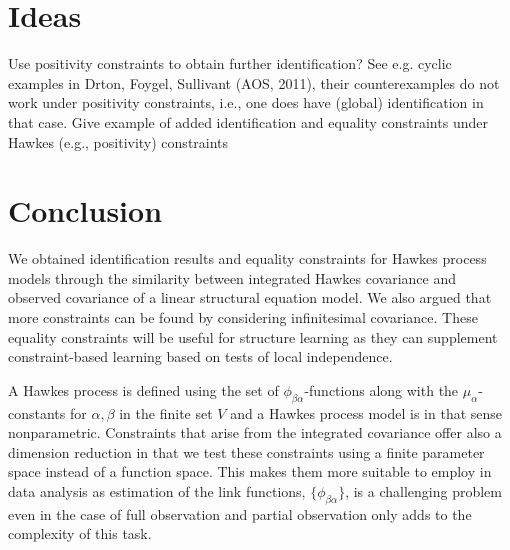 \documentclass[accepted]{uai2021} %
\begin{document}

\section{Ideas}

Use positivity constraints to obtain further identification? See e.g. cyclic 
examples in Drton, Foygel, Sullivant (AOS, 2011), their counterexamples do not 
work under positivity constraints, i.e., one does have (global) identification 
in that case. Give example of added identification and equality constraints 
under Hawkes (e.g., positivity) constraints

\section{Conclusion}

We obtained identification results and equality constraints for Hawkes process 
models through the similarity between integrated Hawkes covariance and observed 
covariance of a linear structural equation model. We also argued that more 
constraints can be found by considering infinitesimal covariance. These 
equality constraints will be useful for structure learning as they can 
supplement constraint-based learning based on tests of local independence.

A Hawkes process is defined using the set of $\phi_{\beta\alpha}$-functions 
along 
with the $\mu_\alpha$-constants for $\alpha,\beta$ in the finite set $V$ and a 
Hawkes process model is in that sense nonparametric.  Constraints that arise 
from the integrated covariance offer also a dimension reduction in that we  
test these constraints using a finite parameter space instead of a 
function space. This makes them more suitable to employ in data analysis 
as estimation of the link functions, $\{\phi_{\beta\alpha} \}$, is a 
challenging problem even in the case of full 
observation and partial observation only adds to the 
complexity of this task.





\begin{contributions} %

\end{contributions}
\end{document}
